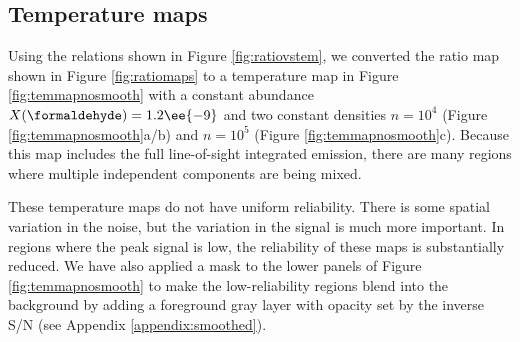 \subsection{Temperature maps}
\label{sec:formaldehydetemmap}
Using the relations shown in Figure \ref{fig:ratiovstem}, we converted the
ratio map shown in Figure \ref{fig:ratiomaps} to a temperature map in Figure
\ref{fig:temmapnosmooth} with a constant abundance $X(\formaldehyde)=1.2\ee{-9}$ 
and two constant densities $n=10^4$ (Figure \ref{fig:temmapnosmooth}a/b) and
$n=10^5$ \percc (Figure \ref{fig:temmapnosmooth}c).  Because this map includes
the full line-of-sight integrated emission, there are many regions where
multiple independent components are being mixed.



These temperature maps do not have uniform reliability.  There is some spatial
variation in the noise, but the variation in the signal is much more important.
In regions where the peak signal is low, the reliability of these maps is
substantially reduced.  We have also applied a mask to the lower panels of
Figure \ref{fig:temmapnosmooth} to make the low-reliability regions blend into
the background by adding a foreground gray layer with opacity set by the
inverse S/N (see Appendix \ref{appendix:smoothed}).

